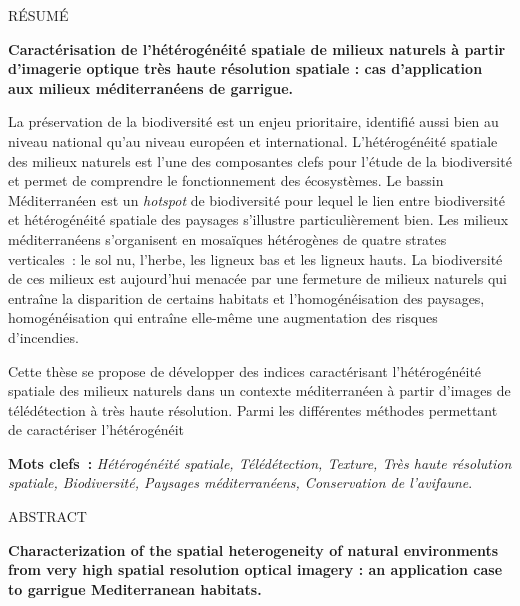 \small
{}
{\centerline {{\sffamily \Large RÉSUMÉ}}}

\noindent\textbf{Caractérisation de l’hétérogénéité spatiale de milieux naturels à partir d’imagerie optique très haute résolution spatiale : cas d’application aux milieux méditerranéens de garrigue.}

\noindent La préservation de la biodiversité est un enjeu prioritaire, identifié aussi bien au niveau national qu’au niveau européen et international. L’hétérogénéité spatiale des milieux naturels est l’une des composantes clefs pour l’étude de la biodiversité et permet de comprendre le fonctionnement des écosystèmes. Le bassin Méditerranéen est un \emph{hotspot} de biodiversité pour lequel le lien entre biodiversité et hétérogénéité spatiale des paysages s’illustre particulièrement bien. Les milieux méditerranéens s'organisent en mosaïques hétérogènes de quatre strates verticales~: le sol nu, l’herbe, les ligneux bas et les ligneux hauts. La biodiversité de ces milieux est aujourd'hui menacée par une fermeture de milieux naturels qui entraîne la disparition de certains habitats et l’homogénéisation des paysages, homogénéisation qui entraîne elle-même une augmentation des risques d’incendies.

\noindent Cette thèse se propose de développer des indices caractérisant l’hétérogénéité spatiale des milieux naturels dans un contexte méditerranéen à partir d’images de télédétection à très haute résolution. Parmi les différentes méthodes permettant de caractériser l'hétérogénéit

\noindent\textbf{Mots clefs~:}{ \it Hétérogénéité spatiale, Télédétection, Texture, Très haute résolution spatiale, Biodiversité, Paysages méditerranéens, Conservation de l’avifaune}.
\vskip 0.5cm
\noindent

{\centerline {{\sffamily \Large ABSTRACT}}}

\noindent\textbf{Characterization of the spatial heterogeneity of natural environments from very high spatial resolution optical imagery : an application case to garrigue Mediterranean habitats.}

